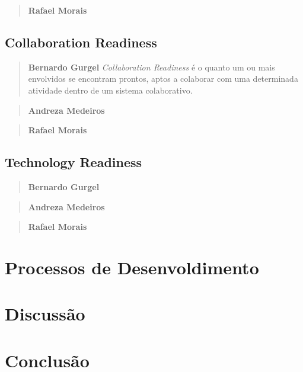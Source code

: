 \documentclass{acm_proc_article-sp}
\begin{document}
\begin{quote}\textbf{Rafael Morais}
\end{quote}

\subsection{Collaboration Readiness}

\begin{quote}\textbf{Bernardo Gurgel}
\textsl{Collaboration Readiness} é o quanto um ou mais envolvidos se encontram prontos, aptos a colaborar com uma determinada atividade dentro de um sistema colaborativo.
\end{quote}

\begin{quote}\textbf{Andreza Medeiros}
\end{quote}

\begin{quote}\textbf{Rafael Morais}
\end{quote}

\subsection{Technology Readiness}

\begin{quote}\textbf{Bernardo Gurgel}
\end{quote}

\begin{quote}\textbf{Andreza Medeiros}
\end{quote}

\begin{quote}\textbf{Rafael Morais}
\end{quote}


\section{Processos de Desenvoldimento}

\section{Discussão}
%

\section{Conclusão}

%


\balancecolumns
\end{document}
